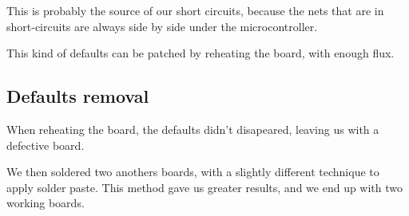 This is probably the source of our short circuits, because the nets that
are in short-circuits are always side by side under the microcontroller.

This kind of defaults can be patched by reheating the board, with enough
flux.

\subsection{Defaults removal}
When reheating the board, the defaults didn't disapeared, leaving us with a
defective board.

We then soldered two anothers boards, with a slightly different technique to
apply solder paste. This method gave us greater results, and we end up with
two working boards.
